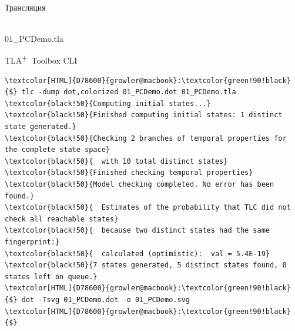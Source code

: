 \documentclass[
  11pt,aspectratio=1610,pdf,hyperref={unicode,colorlinks=false}
]{beamer}
\def\TLA{TLA\textsuperscript{+}}
\begin{document}
\begin{frame}[t,fragile]
  \vspace{1ex}\\
  \strut{}Трансляция\\%
  \begin{minipage}{\textwidth}%
  \end{minipage}
\end{frame}

\begin{frame}[c]
  \\[2ex]%
  {\normalsize\ttfamily\textcolor{black!80}{01\_PCDemo.tla}}
\end{frame}

\begin{frame}[c,fragile]
  {\centering\Large \TLA\ Toolbox CLI\\}
  \begin{tcolorbox}[colback=shellbgcolor,boxrule=.25pt]%
    \scriptsize%
    \begin{Verbatim}[commandchars=\\\{\}]
\textcolor[HTML]{D78600}{growler@macbook}:\textcolor{green!90!black}{$} tlc -dump dot,colorized 01_PCDemo.dot 01_PCDemo.tla
\textcolor{black!50}{Computing initial states...}
\textcolor{black!50}{Finished computing initial states: 1 distinct state generated.}
\textcolor{black!50}{Checking 2 branches of temporal properties for the complete state space}
\textcolor{black!50}{  with 10 total distinct states}
\textcolor{black!50}{Finished checking temporal properties}
\textcolor{black!50}{Model checking completed. No error has been found.}
\textcolor{black!50}{  Estimates of the probability that TLC did not check all reachable states}
\textcolor{black!50}{  because two distinct states had the same fingerprint:}
\textcolor{black!50}{  calculated (optimistic):  val = 5.4E-19}
\textcolor{black!50}{7 states generated, 5 distinct states found, 0 states left on queue.}
\textcolor[HTML]{D78600}{growler@macbook}:\textcolor{green!90!black}{$} dot -Tsvg 01_PCDemo.dot -o 01_PCDemo.svg
\textcolor[HTML]{D78600}{growler@macbook}:\textcolor{green!90!black}{$}
    \end{Verbatim}
  \end{tcolorbox}
\end{frame}
\end{document}
